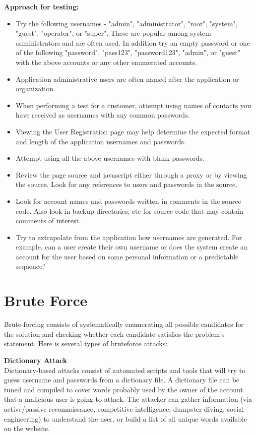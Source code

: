 	{\bf Approach for testing:}
	\begin{itemize}
		\item Try the following usernames - "admin", "administrator", "root", "system", "guest", "operator",
		or "super". These are popular among system administrators and are often used. In addition try an 
		empty password or one of the following "password", "pass123", "password123", "admin", or "guest" 
		with the above accounts or any other enumerated accounts. 
		\item Application administrative users are often named after the application or organization. 
		\item When performing a test for a customer, attempt using names of contacts you have received 
		as usernames with any common passwords.
		\item Viewing the User Registration page may help determine the expected format and length of 
		the application usernames and passwords.
		\item Attempt using all the above usernames with blank passwords.
		\item Review the page source and javascript either through a proxy or by viewing the source. 
		Look for any references to users and passwords in the source.
		\item Look for account names and passwords written in comments in the source code. Also look 
		in backup directories, etc for source code that may contain comments of interest.
		\item Try to extrapolate from the application how usernames are generated. For example, 
		can a user create their own username or does the system create an account for the user based 
		on some personal information or a predictable sequence? 
	\end{itemize}


\clearpage
\section{Brute Force}
	Brute-forcing consists of systematically enumerating all possible candidates for the solution 
	and checking whether each candidate satisfies the problem's statement. Here is several types of
	bruteforce attacks:

	{\bf Dictionary Attack} \\
	Dictionary-based attacks consist of automated scripts and tools that will try to guess username 
	and passwords from a dictionary file. A dictionary file can be tuned and compiled to cover words 
	probably used by the owner of the account that a malicious user is going to attack. The attacker 
	can gather information (via active/passive reconnaissance, competitive intelligence, dumpster 
	diving, social engineering) to understand the user, or build a list of all unique words available 
	on the website.

